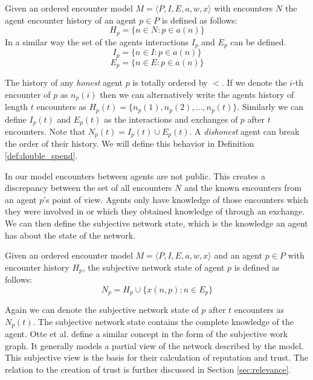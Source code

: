 \begin{defn}
    Given an ordered encounter model $M = \langle P, I, E, a, w, x \rangle$ with encounters $N$ the 
    agent encounter history of an agent $p \in P$ is defined as follows:
    \begin{equation}
        H_p = \{ n \in N : p \in a(n) \}
    \end{equation}
    In a similar way the set of the agents interactions $I_p$ and $E_p$ can be defined.
    \begin{equation}
        I_p = \{ n \in I : p \in a(n) \}
    \end{equation}
    \begin{equation}
        E_p = \{ n \in E : p \in a(n) \}
    \end{equation}
\end{defn}

The history of any \textit{honest} agent $p$ is totally ordered by $<$. If we denote the 
$i$-th encounter of $p$ as $n_p(i)$ then we can alternatively write the agents history of length $t$ 
encounters as $H_p(t) = \{ n_p(1), n_p(2), ..., n_p(t)\}$. Similarly we can define $I_p(t)$ and 
$E_p(t)$ as the interactions and exchanges of $p$ after $t$ encounters. Note that $N_p(t) = I_p(t) \cup E_p(t)$. 
A \textit{dishonest} agent can break the order of their history. We will define this behavior in 
Definition \ref{def:double_spend}.

In our model encounters between agents are not public. This creates a discrepancy between the set of all
encounters $N$ and the known encounters from an agent $p$'s point of view. Agents only have 
knowledge of those encounters which they were involved in or which they obtained knowledge of through an exchange.
We can then define the subjective network state, which is the knowledge an agent has about the state of
the network.

\begin{defn}
    \label{def:subjective_network_state}
    Given an ordered encounter model $M = \langle P, I, E, a, w, x \rangle$  and an agent $p \in P$ 
    with encounter history $H_p$, the subjective network state of agent $p$
    is defined as follows:
    \begin{equation}
        N_p = H_p \cup \{ x(n, p) : n \in E_p \}
    \end{equation}
\end{defn}

Again we can denote the subjective network state of $p$ after $t$ encounters as $N_p(t)$.
The subjective network state contains the complete knowledge of the agent. Otte et al. define a
similar concept in the form of the subjective work graph. It generally models a partial view
of the network described by the model. This subjective view is the basis for their calculation of 
reputation and trust. The relation to the creation of trust is further discussed in Section \ref{sec:relevance}.

